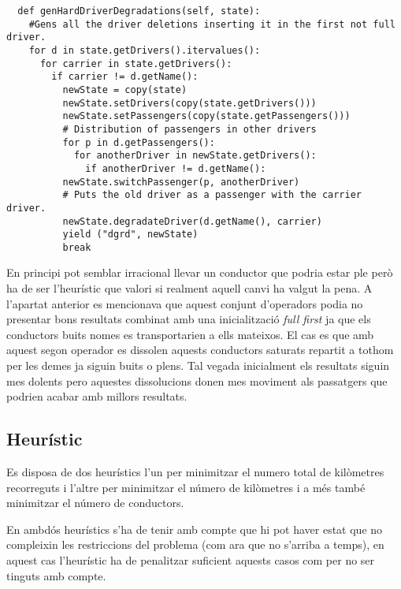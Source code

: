 \begin{verbatim}
  def genHardDriverDegradations(self, state):
    #Gens all the driver deletions inserting it in the first not full driver.
    for d in state.getDrivers().itervalues():
      for carrier in state.getDrivers():
        if carrier != d.getName():
          newState = copy(state)
          newState.setDrivers(copy(state.getDrivers()))
          newState.setPassengers(copy(state.getPassengers()))
          # Distribution of passengers in other drivers
          for p in d.getPassengers():
            for anotherDriver in newState.getDrivers():
              if anotherDriver != d.getName():
          newState.switchPassenger(p, anotherDriver)
          # Puts the old driver as a passenger with the carrier driver.
          newState.degradateDriver(d.getName(), carrier)
          yield ("dgrd", newState)
          break
\end{verbatim}

En principi pot semblar irracional llevar un conductor que podria estar ple però ha de ser l'heurístic
que valori si realment aquell canvi ha valgut la pena.
A l'apartat anterior es mencionava que aquest conjunt d'operadors podia no presentar bons resultats
combinat amb una inicialització \emph{full first} ja que els conductors buits nomes es transportarien
a ells mateixos. El cas es que amb aquest segon operador es dissolen aquests conductors saturats
repartit a tothom per les demes ja siguin buits o plens. Tal vegada inicialment els resultats siguin
mes dolents pero aquestes dissolucions donen mes moviment als passatgers que podrien acabar amb millors
resultats.




\subsection{Heurístic}
Es disposa de dos heurístics l'un per minimitzar el numero total de kilòmetres recorreguts i l'altre per
minimitzar el número de kilòmetres i a més també minimitzar el número de conductors.

En ambdós heurístics s'ha de tenir amb compte que hi pot haver estat que no compleixin les restriccions del problema
(com ara que no s'arriba a temps), en aquest cas l'heurístic ha de penalitzar suficient aquests casos com per no
ser tinguts amb compte.
